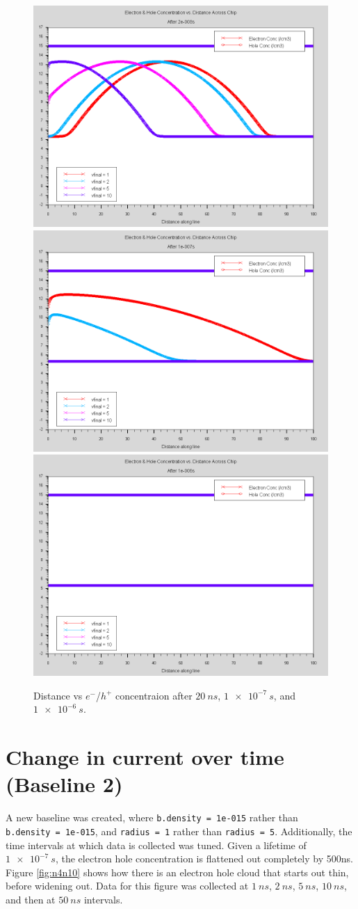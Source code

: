 \documentclass[12pt]{article}
\begin{document}
  \begin{figure}[htp]
    \centering
    \includegraphics[width=.3\textwidth]{voltage_after2e-008s}\hfill
    \includegraphics[width=.3\textwidth]{voltage_after1e-007s}\hfill
    \includegraphics[width=.3\textwidth]{voltage_after1e-006s}
    \caption{Distance vs $e^-$/$h^+$ concentraion after $\SI{20}{ns}$, $\SI{1e-7}{s}$, and $\SI{1e-6}{s}$.}
    \label{fig:distancevcurrent_voltage}
  \end{figure}

  \section{Change in current over time (Baseline 2)}

  A new baseline was created, where \lstinline{b.density = 1e-015} rather than \\\lstinline{b.density = 1e-015}, and \lstinline{radius = 1} rather than \lstinline{radius = 5}. Additionally, the time intervals at which data is collected was tuned. Given a lifetime of $\SI{1e-7}{s}$, the electron hole concentration is flattened out completely by 500ns. Figure \ref{fig:n4n10} shows how there is an electron hole cloud that starts out thin, before widening out. Data for this figure was collected at $\SI{1}{ns}$, $\SI{2}{ns}$, $\SI{5}{ns}$, $\SI{10}{ns}$, and then at $\SI{50}{ns}$ intervals.
\end{document}
